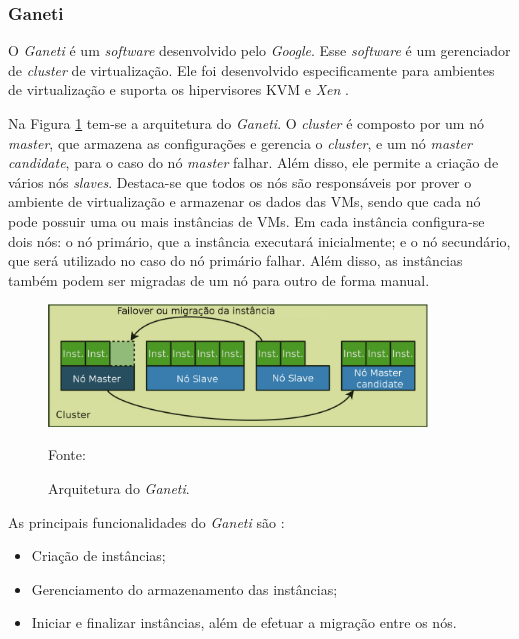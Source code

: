 \subsubsection{Ganeti}
\label{section:ganeti}
O \textit{Ganeti} \cite{ganeti} é um \textit{software} desenvolvido pelo \textit{Google}. Esse \textit{software} é um gerenciador de 
\textit{cluster} de virtualização. Ele foi desenvolvido especificamente para ambientes de virtualização e suporta os hipervisores 
\ac{KVM} \cite{kvm} e \textit{Xen} \cite{xen}. 

Na Figura \ref{fig:ganeti_arquitetura} tem-se a arquitetura do \textit{Ganeti}. O \textit{cluster} é composto por um nó \textit{master}, que 
armazena as configurações e gerencia o \textit{cluster}, e um nó \textit{master candidate}, para o caso do nó \textit{master} falhar. 
Além disso, ele permite a criação de vários nós \textit{slaves}. Destaca-se que todos os nós são responsáveis por prover o ambiente de 
virtualização e armazenar os dados das \acp{VM}, sendo que cada nó pode possuir uma ou mais instâncias de \acp{VM}. Em cada instância 
configura-se dois nós: o nó primário, que a instância executará inicialmente; e o nó secundário, que será utilizado no caso do nó primário falhar.
Além disso, as instâncias também podem ser migradas de um nó para outro de forma manual. 

\begin{figure}[h!]
 \centering
 \includegraphics[width=380px]{img/ganeti_arquitetura.eps}
 \caption{Arquitetura do \textit{Ganeti}.}
 Fonte: \citet{carvalho2011}
 \label{fig:ganeti_arquitetura}
\end{figure}

\newpage
As principais funcionalidades do \textit{Ganeti} são \cite{ganeti}:
\begin{itemize}
 \item Criação de instâncias;
 \item Gerenciamento do armazenamento das instâncias;
 \item Iniciar e finalizar instâncias, além de efetuar a migração entre os nós.
\end{itemize}



